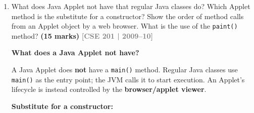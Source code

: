 \documentclass[12pt,a3paper]{article}
\newcommand{\yr}[1]{\hfill\textcolor{gray}{\small\textbf{[#1]}}}
\newcommand{\mk}[1]{\textcolor{orange!70!black}{\small\textbf{(#1 marks)}}}
\begin{document}
\begin{enumerate}
\begin{tcolorbox}
\begin{lstlisting}[language=Java]
        add(promptLabel);
        add(limitField);
        add(clickButton);
        add(countLabel);

        clickButton.addActionListener(e -> {
            // Read the limit from the text field if not yet set
            try {
                limit = Integer.parseInt(limitField.getText().trim());
            } catch (NumberFormatException ex) {
                limit = Integer.MAX_VALUE;
            }

            if (clicks < limit) {
                clicks++;
                countLabel.setText("Clicks: " + clicks);
                if (clicks == limit)
                    JOptionPane.showMessageDialog(this,
                        "Limit of " + limit
                        + " clicks reached!");
            } else {
                JOptionPane.showMessageDialog(this,
                    "Click limit already reached. No more counting.");
            }
        });

        setSize(350, 120);
        setVisible(true);
    }

    public static void main(String[] args) {
        SwingUtilities.invokeLater(ClickCounter::new);
    }
}
\end{lstlisting}

\end{tcolorbox}



\item What does Java Applet not have that regular Java classes do? Which Applet method is the substitute for a constructor? Show the order of method calls from an Applet object by a web browser. What is the use of the \texttt{paint()} method? \mk{15}
\yr{CSE 201 | 2009--10}

\begin{tcolorbox}[enhanced,breakable,ansbox,
  colback=cC!4,colframe=cC,boxrule=0.8pt,arc=5pt,
  title={\textbf{Answer — Applet vs Regular Class;
  Life-Cycle; paint()}},
  fonttitle=\bfseries\color{white},colbacktitle=cC]

\textbf{What does a Java Applet not have?}

A Java Applet does \textbf{not} have a
\texttt{main()} method. Regular Java classes use
\texttt{main()} as the entry point; the JVM calls
it to start execution. An Applet's lifecycle is
instead controlled by the \textbf{browser/applet
viewer}.

\medskip
\textbf{Substitute for a constructor:}


\end{tcolorbox}
\end{enumerate}
\end{document}
